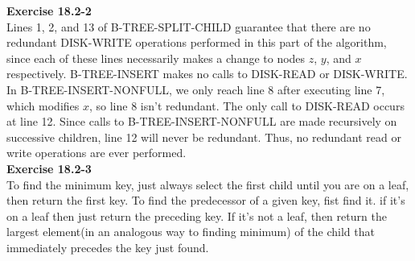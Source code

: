 \documentclass{article}
\begin{document}


\noindent\textbf{Exercise 18.2-2}\\

Lines 1, 2, and 13 of B-TREE-SPLIT-CHILD guarantee that there are no redundant DISK-WRITE operations performed in this part of the algorithm, since each of these lines necessarily makes a change to nodes $z$, $y$, and $x$ respectively.  B-TREE-INSERT makes no calls to DISK-READ or DISK-WRITE.  In B-TREE-INSERT-NONFULL, we only reach line 8 after executing line 7, which modifies $x$, so line 8 isn't redundant.  The only call to DISK-READ occurs at line 12.  Since calls to B-TREE-INSERT-NONFULL are made recursively on successive children, line 12 will never be redundant.  Thus, no redundant read or write operations are ever performed.\\

\noindent\textbf{Exercise 18.2-3}\\

To find the minimum key, just always select the first child until you are on a leaf, then return the first key. To find the predecessor of a given key, fist find it. if it's on a leaf then just return the preceding key. If it's not a leaf, then return the largest element(in an analogous way to finding minimum) of the child that immediately precedes the key just found.\\ 
\end{document}

